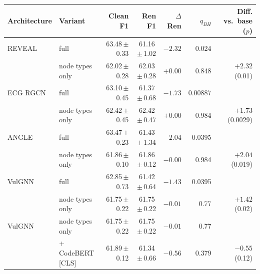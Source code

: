 \begin{tabular}{llrrrrr}
\toprule
Architecture & Variant & Clean F1 & Ren F1 & $\Delta$Ren & $q_{BH}$ & Diff. vs.\ base ($p$) \\
\midrule
REVEAL & full & 63.48\,$\pm$\,0.33 & 61.16\,$\pm$\,1.02 & $\mathbf{-2.32}$ & 0.024 &  \\
 & node types only & 62.02\,$\pm$\,0.28 & 62.03\,$\pm$\,0.28 & $+0.00$ & 0.848 & $+2.32$ (0.01) \\
\midrule
ECG RGCN & full & 63.10\,$\pm$\,0.45 & 61.37\,$\pm$\,0.68 & $\mathbf{-1.73}$ & 0.00887 &  \\
 & node types only & 62.42\,$\pm$\,0.45 & 62.42\,$\pm$\,0.47 & $+0.00$ & 0.984 & $+1.73$ (0.0029) \\
\midrule
ANGLE & full & 63.47\,$\pm$\,0.23 & 61.43\,$\pm$\,1.34 & $\mathbf{-2.04}$ & 0.0395 &  \\
 & node types only & 61.86\,$\pm$\,0.10 & 61.86\,$\pm$\,0.12 & $-0.00$ & 0.984 & $+2.04$ (0.019) \\
\midrule
VulGNN & full & 62.85\,$\pm$\,0.73 & 61.42\,$\pm$\,0.64 & $\mathbf{-1.43}$ & 0.0395 &  \\
 & node types only & 61.75\,$\pm$\,0.22 & 61.75\,$\pm$\,0.22 & $-0.01$ & 0.77 & $+1.42$ (0.02) \\
\midrule
VulGNN & node types only & 61.75\,$\pm$\,0.22 & 61.75\,$\pm$\,0.22 & $-0.01$ & 0.77 &  \\
 & + CodeBERT [CLS] & 61.89\,$\pm$\,0.12 & 61.34\,$\pm$\,0.66 & $-0.56$ & 0.379 & $-0.55$ (0.12) \\
\bottomrule
\end{tabular}
